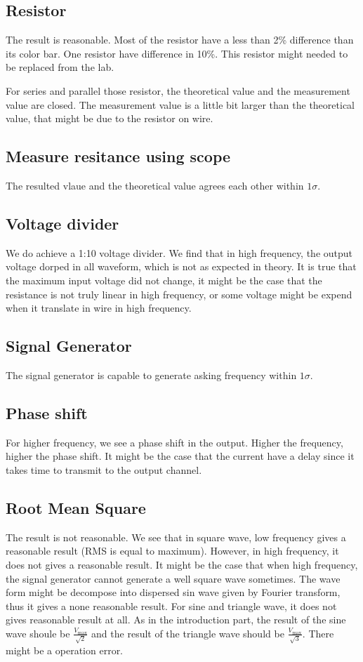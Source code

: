 \documentclass[aps,prl,reprint]{revtex4-1}
\begin{document}
    \subsection{Resistor}
    The result is reasonable. Most of the resistor have a less than 2\% difference than its color bar. One resistor have difference in 10\%. This resistor might needed to be replaced from the lab.

    For series and parallel those resistor, the theoretical value and the measurement value are closed. The measurement value is a little bit larger than the theoretical value, that might be due to the resistor on wire.
    \subsection{Measure resitance using scope}
    The resulted vlaue and the theoretical value agrees each other within $1\sigma$.
    \subsection{Voltage divider}
    We do achieve a 1:10 voltage divider. We find that in high frequency, the output voltage dorped in all waveform, which is not as expected in theory. It is true that the maximum input voltage did not change, it might be the case that the resistance is not truly linear in high frequency, or some voltage might be expend when it translate in wire in high frequency.
    \subsection{Signal Generator}
    The signal generator is capable to generate asking frequency within $1\sigma$.
    \subsection{Phase shift}
    For higher frequency, we see a phase shift in the output. Higher the frequency, higher the phase shift. It might be the case that the current have a delay since it takes time to transmit to the output channel.
    \subsection{Root Mean Square}
    The result is not reasonable. We see that in square wave, low frequency gives a reasonable result (RMS is equal to maximum). However, in high frequency, it does not gives a reasonable result. It might be the case that when high frequency, the signal generator cannot generate a well square wave sometimes. The wave form might be decompose into dispersed sin wave given by Fourier transform, thus it gives a none reasonable result. For sine and triangle wave, it does not gives reasonable result at all. As in the introduction part, the result of the sine wave shoule be $\frac{V_\text{max}}{\sqrt{2}}$ and the result of the triangle wave should be $\frac{V_\text{max}}{\sqrt{3}}$. There might be a operation error.
\end{document}
